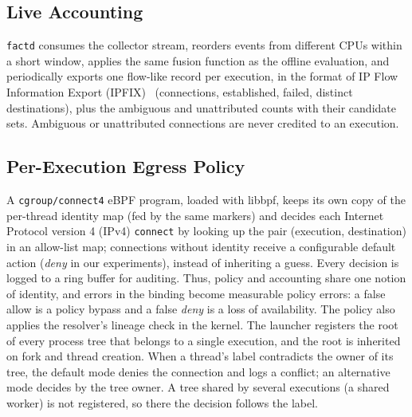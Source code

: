 \subsection{Live Accounting}
\texttt{factd} consumes the collector stream, reorders events from different CPUs within a short window, applies the same fusion function as the offline evaluation, and periodically exports one flow-like record per execution, in the format of IP Flow Information Export (IPFIX)~\cite{rfc7011} (\ie connections, established, failed, distinct destinations), plus the ambiguous and unattributed counts with their candidate sets. Ambiguous or unattributed connections are never credited to an execution.

\subsection{Per-Execution Egress Policy}

A \texttt{cgroup/connect4} eBPF program, loaded with libbpf, keeps its own copy of the per-thread identity map (fed by the same markers) and decides each Internet Protocol version 4 (IPv4) \texttt{connect} by looking up the pair (execution, destination) in an allow-list map; connections without identity receive a configurable default action (\textit{deny} in our experiments), instead of inheriting a guess. Every decision is logged to a ring buffer for auditing. Thus, policy and accounting share one notion of identity, and errors in the binding become measurable policy errors: a false allow is a policy bypass and a false \textit{deny} is a loss of availability. The policy also applies the resolver's lineage check in the kernel. The launcher registers the root of every process tree that belongs to a single execution, and the root is inherited on fork and thread creation. When a thread's label contradicts the owner of its tree, the default mode denies the connection and logs a conflict; an alternative mode decides by the tree owner. A tree shared by several executions (a shared worker) is not registered, so there the decision follows the label.
